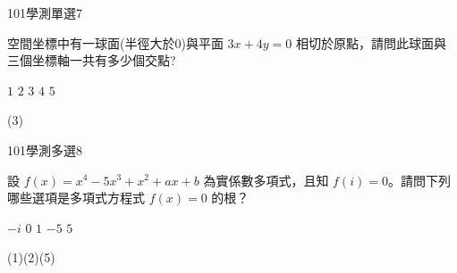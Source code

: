     \begin{QUESTION}
        \begin{ExamInfo}{101}{學測}{單選}{7}
        \end{ExamInfo}
        \begin{ExamAnsRateInfo}{37}{45}{34}{32}
        \end{ExamAnsRateInfo}
        \begin{QBODY}
            空間坐標中有一球面(半徑大於0)與平面 $3x+4y=0$ 相切於原點，請問此球面與三個坐標軸一共有多少個交點? 
			\begin{QOPS} 
				\QOP $1$ 
				\QOP $2$ 
				\QOP $3$ 
				\QOP $4$ 
				\QOP $5$
			\end{QOPS}
        \end{QBODY}
        \begin{QFROMS}
        \end{QFROMS}
        \begin{QTAGS}\end{QTAGS}
        \begin{QANS}
            (3)
        \end{QANS}
        \begin{QSOLLIST}
        \end{QSOLLIST}
        \begin{QEMPTYSPACE}
        \end{QEMPTYSPACE}
    \end{QUESTION}
    \begin{QUESTION}
        \begin{ExamInfo}{101}{學測}{多選}{8}
        \end{ExamInfo}
        \begin{ExamAnsRateInfo}{56}{92}{58}{18}
        \end{ExamAnsRateInfo}
        \begin{QBODY}
            設 $f(x) = x^4-5x^3+x^2+ax+b$ 為實係數多項式，且知 $f( i)  =0 $。請問下列哪些選項是多項式方程式 $f (x ) = 0$ 的根？
		\begin{QOPS} 
			\QOP  $-i$ 
			\QOP  $0$
			\QOP  $1$ 
			\QOP  $-5$ 
			\QOP  $5$
		\end{QOPS}
        \end{QBODY}
        \begin{QFROMS}
        \end{QFROMS}
        \begin{QTAGS}\end{QTAGS}
        \begin{QANS}
            (1)(2)(5)
        \end{QANS}
        \begin{QSOLLIST}
        \end{QSOLLIST}
        \begin{QEMPTYSPACE}
        \end{QEMPTYSPACE}
    \end{QUESTION}
